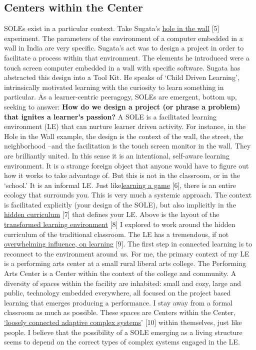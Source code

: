 \subsection{Centers within the Center}

SOLEs exist in a particular context. Take Sugata's
\href{http://www.ted.com/talks/sugata\_mitra\_shows\_how\_kids\_teach\_themselves.html}{hole
in the wall} {[}5{]} experiment. The parameters of the environment of a
computer embedded in a wall in India are very specific. Sugata's act was
to design a project in order to facilitate a process within that
environment. The elements he introduced were a touch screen computer
embedded in a wall with specific software. Sugata has abstracted this
design into a Tool Kit. He speaks of `Child Driven Learning',
intrinsically motivated learning with the curiosity to learn something
in particular. As a learner-centric peeragogy, SOLEs are emergent,
bottom up, seeking to answer: \textbf{How do we design a project (or
phrase a problem) that ignites a learner's passion?} A SOLE is a
facilitated learning environment (LE) that can nurture learner driven
activity. For instance, in the Hole in the Wall example, the design is
the context of the wall, the street, the neighborhood --and the
facilitation is the touch screen monitor in the wall. They are
brilliantly united. In this sense it is an intentional, self-aware
learning environment. It is a strange foreign object that anyone would
have to figure out how it works to take advantage of. But this is not in
the classroom, or in the `school.' It is an informal LE. Just
like\href{http://www.academia.edu/1137269/Game-based\_Learning\_and\_Intrinsic\_Motivation}{learning
a game} {[}6{]}, there is an entire ecology that surrounds you. This is
very much a systemic approach. The context is facilitated explicitly
(your design of the SOLE), but also implicitly in the
\href{http://en.wikipedia.org/wiki/Hidden\_curriculum}{hidden
curriculum} {[}7{]} that defines your LE. Above is the layout of the
\href{http://www.scribd.com/doc/181089012/Transformed-Learning-Environment-Analysis}{transformed
learning environment} {[}8{]} I explored to work around the hidden
curriculum of the traditional classroom. The LE has a tremendous, if not
\href{http://scholar.lib.vt.edu/theses/available/etd-09232007-220306/unrestricted/SElmasryETDbodytext.pdf}{overwhelming
influence, on learning} {[}9{]}. The first step in connected learning is
to reconnect to the environment around us. For me, the primary context
of my LE is a performing arts center at a small rural liberal arts
college. The Performing Arts Center is a Center within the context of
the college and community. A diversity of spaces within the facility are
inhabited: small and cozy, large and public, technology embedded
everywhere, all focused on the project based learning that emerges
producing a performance. I stay away from a formal classroom as much as
possible. These spaces are Centers within the Center,
\href{http://nourdiab.wordpress.com/2011/02/23/the-theories-of-christopher-alexander/}{`loosely
connected adaptive complex systems}' {[}10{]} within themselves, just
like people. I believe that the possibility of a SOLE emerging as a
living structure seems to depend on the correct types of complex systems
engaged in the LE.

